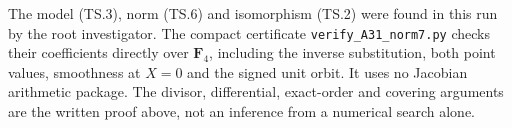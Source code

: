 The model (TS.3), norm (TS.6) and isomorphism (TS.2) were found
in this run by the root investigator.  The compact certificate
\texttt{verify\_A31\_norm7.py} checks their coefficients directly
over $\mathbf F_4$, including the inverse substitution, both point
values, smoothness at $X=0$ and the signed unit orbit.  It uses no
Jacobian arithmetic package.  The divisor, differential, exact-order
and covering arguments are the written proof above, not an
inference from a numerical search alone.
